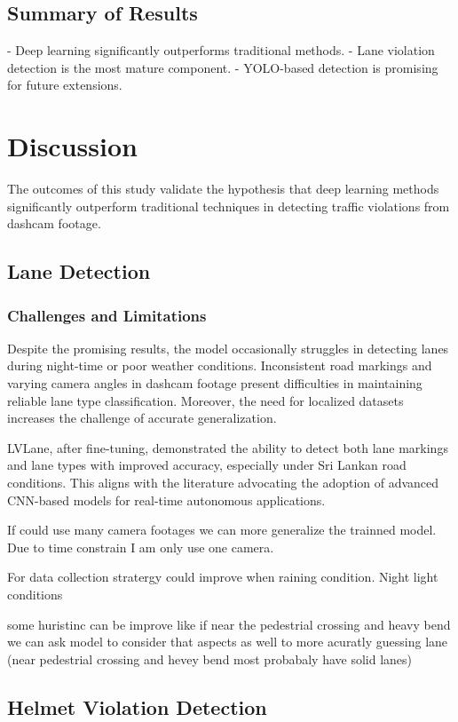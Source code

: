 \documentclass[12pt,a4paper]{article}
\begin{document}
\subsection{Summary of Results}
- Deep learning significantly outperforms traditional methods.
- Lane violation detection is the most mature component.
- YOLO-based detection is promising for future extensions.

\section{Discussion}
The outcomes of this study validate the hypothesis that deep learning methods significantly outperform traditional techniques in detecting traffic violations from dashcam footage. 

\subsection{Lane Detection}
\subsubsection{Challenges and Limitations}
Despite the promising results, the model occasionally struggles in detecting lanes during night-time or poor weather conditions. Inconsistent road markings and varying camera angles in dashcam footage present difficulties in maintaining reliable lane type classification. Moreover, the need for localized datasets increases the challenge of accurate generalization.

LVLane, after fine-tuning, demonstrated the ability to detect both lane markings and lane types with improved accuracy, especially under Sri Lankan road conditions. This aligns with the literature advocating the adoption of advanced CNN-based models for real-time autonomous applications.

If could use many camera footages we can more generalize the trainned model.
Due to time constrain I am only use one camera.

For data collection stratergy could improve when raining condition.
Night light conditions

some huristinc can be improve like if near the pedestrial crossing and heavy bend we can ask model to consider that aspects as well to more acuratly guessing lane 
(near pedestrial crossing and hevey bend most probabaly have solid lanes)



\subsection{Helmet Violation Detection}
\end{document}
